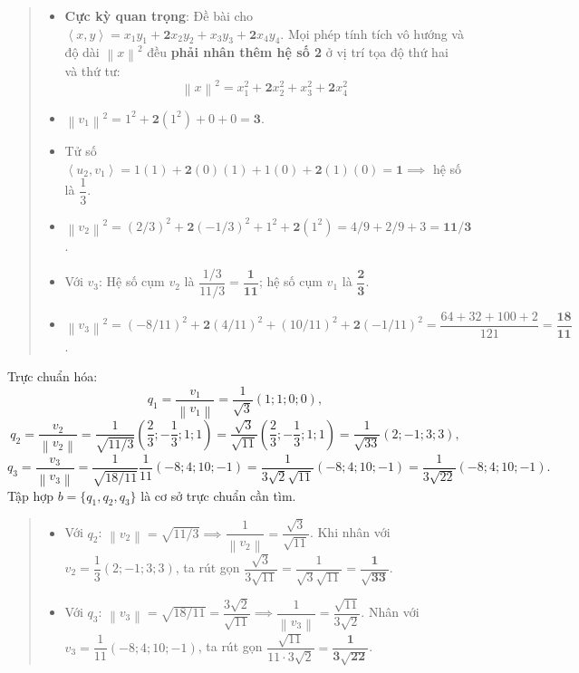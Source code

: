 \documentclass[12pt,a4paper]{article}
\newcommand{\ip}[2]{\left\langle #1,#2\right\rangle}
\newcommand{\norm}[1]{\left\|#1\right\|}
\begin{document}
\begin{quote}
\small
\noindent{}\par\vspace{3pt}
\begin{itemize}[noitemsep,topsep=2pt]
\item \textbf{Cực kỳ quan trọng}: Đề bài cho $\ip{x}{y} = x_1y_1 + \mathbf{2}x_2y_2 + x_3y_3 + \mathbf{2}x_4y_4$. Mọi phép tính tích vô hướng và độ dài $\norm{x}^2$ đều \textbf{phải nhân thêm hệ số 2} ở vị trí tọa độ thứ hai và thứ tư:
  $$\norm{x}^2 = x_1^2 + \mathbf{2}x_2^2 + x_3^2 + \mathbf{2}x_4^2$$
\item $\norm{v_1}^2 = 1^2 + \mathbf{2}(1^2) + 0 + 0 = \mathbf{3}$.
\item Tử số $\ip{u_2}{v_1} = 1(1) + \mathbf{2}(0)(1) + 1(0) + \mathbf{2}(1)(0) = \mathbf{1} \implies$ hệ số là $\dfrac{1}{3}$.
\item $\norm{v_2}^2 = (2/3)^2 + \mathbf{2}(-1/3)^2 + 1^2 + \mathbf{2}(1^2) = 4/9 + 2/9 + 3 = \mathbf{11/3}$.
\item Với $v_3$: Hệ số cụm $v_2$ là $\dfrac{1/3}{11/3} = \mathbf{\dfrac{1}{11}}$; hệ số cụm $v_1$ là $\mathbf{\dfrac{2}{3}}$.
\item $\norm{v_3}^2 = (-8/11)^2 + \mathbf{2}(4/11)^2 + (10/11)^2 + \mathbf{2}(-1/11)^2 = \dfrac{64+32+100+2}{121} = \mathbf{\dfrac{18}{11}}$.
\end{itemize}
\end{quote}

\vspace{0.2cm}
Trực chuẩn hóa:
\[
q_1 = \frac{v_1}{\norm{v_1}} = \frac{1}{\sqrt{3}}(1; 1; 0; 0),
\]
\[
q_2 = \frac{v_2}{\norm{v_2}} = \frac{1}{\sqrt{11/3}}\left(\frac{2}{3}; -\frac{1}{3}; 1; 1\right) = \frac{\sqrt{3}}{\sqrt{11}}\left(\frac{2}{3}; -\frac{1}{3}; 1; 1\right) = \frac{1}{\sqrt{33}}(2; -1; 3; 3),
\]
\[
q_3 = \frac{v_3}{\norm{v_3}} = \frac{1}{\sqrt{18/11}}\frac{1}{11}(-8; 4; 10; -1) = \frac{1}{3\sqrt{2}\sqrt{11}}(-8; 4; 10; -1) = \frac{1}{3\sqrt{22}}(-8; 4; 10; -1).
\]
Tập hợp $b = \{q_1, q_2, q_3\}$ là cơ sở trực chuẩn cần tìm.

\begin{quote}
\small
\noindent{}\par\vspace{3pt}
\begin{itemize}[noitemsep,topsep=2pt]
\item Với $q_2$: $\norm{v_2} = \sqrt{11/3} \implies \dfrac{1}{\norm{v_2}} = \dfrac{\sqrt{3}}{\sqrt{11}}$. Khi nhân với $v_2 = \dfrac{1}{3}(2; -1; 3; 3)$, ta rút gọn $\dfrac{\sqrt{3}}{3\sqrt{11}} = \dfrac{1}{\sqrt{3}\sqrt{11}} = \mathbf{\dfrac{1}{\sqrt{33}}}$.
\item Với $q_3$: $\norm{v_3} = \sqrt{18/11} = \dfrac{3\sqrt{2}}{\sqrt{11}} \implies \dfrac{1}{\norm{v_3}} = \dfrac{\sqrt{11}}{3\sqrt{2}}$. Nhân với $v_3 = \dfrac{1}{11}(-8; 4; 10; -1)$, ta rút gọn $\dfrac{\sqrt{11}}{11 \cdot 3\sqrt{2}} = \mathbf{\dfrac{1}{3\sqrt{22}}}$.
\end{itemize}
\end{quote}
\end{document}
